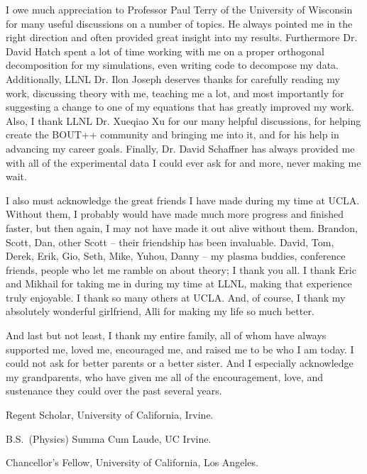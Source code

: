 {I owe much appreciation to Professor Paul Terry of the University of Wisconsin for many useful discussions on a number of topics. He always pointed me in the right direction and often provided
great insight into my results. Furthermore Dr. David Hatch spent a lot of time working with me on a proper orthogonal decomposition for my simulations, even writing code to decompose my data.
Additionally, LLNL Dr. Ilon Joseph deserves thanks for carefully reading my work, discussing theory with me, teaching me a lot,
and most importantly for suggesting a change to one of my equations that has greatly improved my work. Also, I thank LLNL Dr. Xueqiao Xu for our many helpful discussions, for helping create the
BOUT++ community and bringing me into it, and for his help in advancing my career goals. Finally, Dr. David Schaffner has always provided me with all of the experimental data I could ever ask for and
more, never making me wait.

I also must acknowledge the great friends I have made during my time at UCLA. Without them, I probably would have made much more progress and finished faster, but then again, I may not have made it
out alive without them. Brandon, Scott, Dan, other Scott -- their friendship has been invaluable. David, Tom, Derek, Erik, Gio, Seth, Mike, Yuhou, Danny -- my plasma buddies, conference friends, people
who let me ramble on about theory; I thank you all. I thank Eric and Mikhail for taking me in during my time at LLNL, making that experience truly enjoyable. I thank so many others at UCLA.
And, of course, I thank my absolutely wonderful girlfriend, Alli for making my life so much better.

And last but not least, I thank my entire family, all of whom have always supported me, loved me, encouraged me, and raised me to be who I am today. I could not ask for better parents or a better
sister. And I especially acknowledge my grandparents, who have given me all of the encouragement, love, and sustenance they could over the past several years.}



                {Regent Scholar, University of California, Irvine.}

                {B.S.~(Physics) Summa Cum Laude, UC Irvine.}

                {Chancellor's Fellow, University of California, Los Angeles.}

